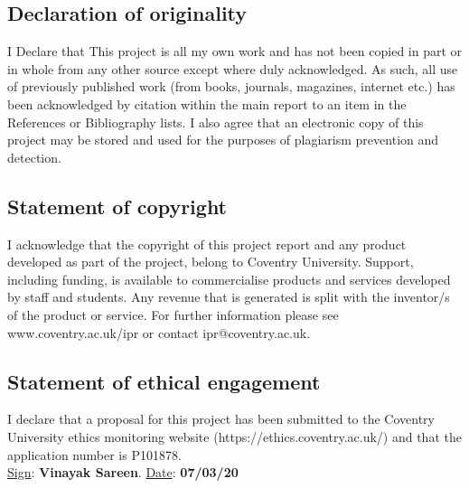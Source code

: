 \subsection*{Declaration of originality}
I Declare that This project is all my own work and has not been copied in part or in whole from any other source except where duly acknowledged.  As such, all use of previously published work (from books, journals, magazines, internet etc.) has been acknowledged by citation within the main report to an item in the References or Bibliography lists. I also agree that an electronic copy of this project may be stored and used for the purposes of plagiarism prevention and detection.
\subsection*{Statement of copyright}
I acknowledge that the copyright of this project report and any product developed as part of the project, belong to Coventry University. 
Support, including funding, is available to commercialise products and services developed by staff and students. 
 Any revenue that is generated is split with the inventor/s of the product or service. 
For further information please see www.coventry.ac.uk/ipr or contact ipr@coventry.ac.uk.
\subsection*{Statement of ethical engagement}

I declare that a proposal for this project has been submitted to the Coventry University ethics monitoring website (https://ethics.coventry.ac.uk/) and that the application number is P101878.
\\ 
\vspace{2mm}
\underline{Sign}: \textbf{Vinayak Sareen}. \hspace{20mm} \underline{Date}:  \textbf{07/03/20}

